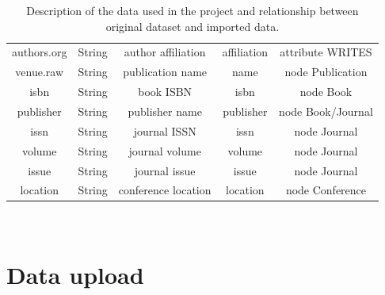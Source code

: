\begin{table}[H]
\begin{tabular}{| c | c | c | c | c |}
        authors.org         & String        & author affiliation   & affiliation            & attribute WRITES\T\B        \\
        venue.raw           & String        & publication name     & name                   & node Publication \T\B       \\
        isbn                & String        & book ISBN            & isbn                   & node Book \T\B              \\
        publisher           & String        & publisher name       & publisher              & node Book/Journal \T\B      \\
        issn                & String        & journal ISSN         & issn                   & node Journal \T\B           \\
        volume              & String        & journal volume       & volume                 & node Journal \T\B           \\
        issue               & String        & journal issue        & issue                  & node Journal \T\B           \\
        location            & String        & conference location  & location               & node Conference \T\B        \\
        \hline
    \end{tabular}
    \\[8pt]
    \caption{Description of the data used in the project and relationship between original dataset and imported data.}
    \label{tab:dataset_description}%
\end{table}


\chapter{Data upload}
\label{ch:data_upload_neo4j}%


